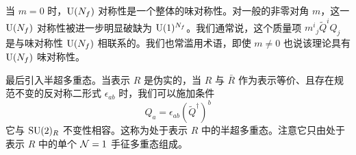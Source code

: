 


当 $m=0$ 时，$\mathrm{U}(N_f)$ 对称性是一个整体的味对称性。对一般的非零对角 $m$，这一 $\mathrm{U}(N_f)$ 对称性被进一步明显破缺为 $\mathrm{U}(1)^{N_f}$。我们通常说，这个质量项 $m^i{}_j\tilde Q^i Q_j$ 是与味对称性 $\mathrm{U}(N_f)$ 相联系的。我们也常滥用术语，即使 $m\neq 0$ 也说该理论具有 $\mathrm{U}(N_f)$ 味对称性。

最后引入半超多重态。当表示 $R$ 是伪实的，\ie 当 $R$ 与 $\bar R$ 作为表示等价、且存在规范不变的反对称二形式 $\epsilon_{ab}$ 时，我们可以施加条件
\begin{equation}
  Q_a = \epsilon_{ab}(\tilde Q^\dagger)^b
  \tag{3.4}
\end{equation}
它与 $\mathrm{SU}(2)_R$ 不变性相容。这称为处于表示 $R$ 中的半超多重态。注意它只由处于表示 $R$ 中的单个 $\mathcal{N}=1$ 手征多重态组成。


